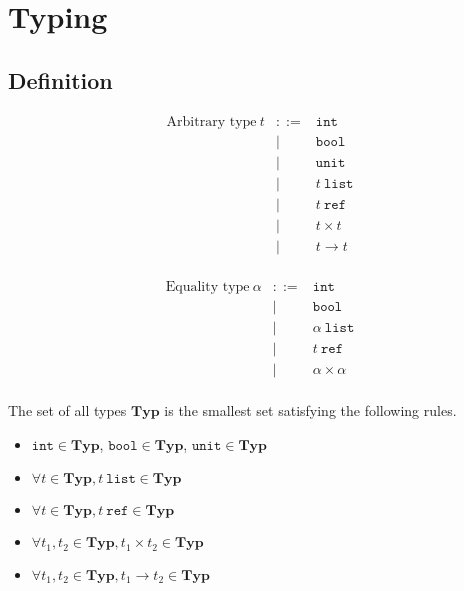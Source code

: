 \documentclass{article}
\begin{document}
\section{Typing}

\subsection{Definition}

\begin{figure}[h]
\begin{minipage}{0.5\textwidth}
\[\begin{array}{rcl}
  \mbox{Arbitrary type}\ t
    & ::= & \texttt{int} \\
    &  |  & \texttt{bool} \\
    &  |  & \texttt{unit} \\
    &  |  & t\ \texttt{list} \\
    &  |  & t\ \texttt{ref} \\
    &  |  & t \times t \\
    &  |  & t \rightarrow t \\
\end{array}\]
\end{minipage}
\begin{minipage}{0.5\textwidth}
\[\begin{array}{rcl}
  \mbox{Equality type}\ \alpha
    & ::= & \texttt{int} \\
    &  |  & \texttt{bool} \\
    &  |  & \alpha\ \texttt{list} \\
    &  |  & t\ \texttt{ref} \\
    &  |  & \alpha \times \alpha \\
\end{array}\]
\end{minipage}
\end{figure}

The set of all types $\mathbf{Typ}$ is the smallest set satisfying the following rules.
\begin{itemize}
  \item $\texttt{int}\in\mathbf{Typ}$, $\texttt{bool}\in\mathbf{Typ}$, $\texttt{unit}\in\mathbf{Typ}$
  \item $\forall t\in\mathbf{Typ}, t\ \texttt{list}\in\mathbf{Typ}$
  \item $\forall t\in\mathbf{Typ}, t\ \texttt{ref}\in\mathbf{Typ}$
  \item $\forall t_1,t_2\in\mathbf{Typ}, t_1\times t_2\in\mathbf{Typ}$
  \item $\forall t_1,t_2\in\mathbf{Typ}, t_1\rightarrow t_2\in\mathbf{Typ}$
\end{itemize}
\end{document}
